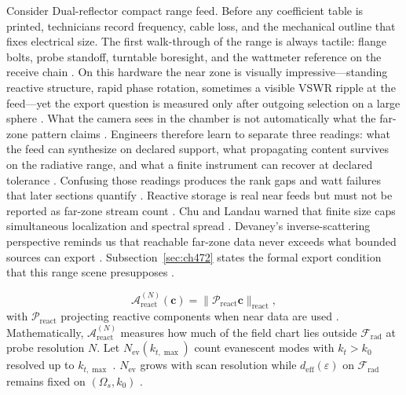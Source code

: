 \begin{physicalvignette}
Consider Dual-reflector compact range feed. Before any coefficient table is printed, technicians record frequency, cable loss, and the mechanical outline that fixes electrical size. The first walk-through of the range is always tactile: flange bolts, probe standoff, turntable boresight, and the wattmeter reference on the receive chain \cite{hansen1988}.
On this hardware the near zone is visually impressive---standing reactive structure, rapid phase rotation, sometimes a visible VSWR ripple at the feed---yet the export question is measured only after outgoing selection on a large sphere \cite{harrington2001}. What the camera sees in the chamber is not automatically what the far-zone pattern claims \cite{stratton1941}.
Engineers therefore learn to separate three readings: what the feed can synthesize on declared support, what propagating content survives on the radiative range, and what a finite instrument can recover at declared tolerance \cite{devaney2004}. Confusing those readings produces the rank gaps and watt failures that later sections quantify \cite{pal2026}.
Reactive storage is real near feeds but must not be reported as far-zone stream count . 
Chu and Landau warned that finite size caps simultaneous localization and spectral spread \cite{chu1948}. Devaney's inverse-scattering perspective reminds us that reachable far-zone data never exceeds what bounded sources can export \cite{devaney2004}.
Subsection~\ref{sec:ch472} states the formal export condition that this range scene presupposes \cite{stratton1941}.
\end{physicalvignette}
\begin{equation}
\label{eq:ch4.reactive-accessibility}
\mathcal{A}_{\mathrm{react}}^{(N)}(\mathbf{c})=\big\|\mathcal{P}_{\mathrm{react}}\mathbf{c}\big\|_{\mathrm{react}},
\end{equation}
with \(\mathcal{P}_{\mathrm{react}}\) projecting reactive components when near data are used \cite{harrington2001}. Mathematically,
\(\mathcal{A}_{\mathrm{react}}^{(N)}\) measures how much of the field chart lies outside \(\mathcal{F}_{\mathrm{rad}}\) at probe resolution \(N\).
Let \(N_{\mathrm{ev}}(k_{t,\max})\) count evanescent modes with \(k_{t}>k_{0}\) resolved up to \(k_{t,\max}\) \cite{jackson1999}.
\(N_{\mathrm{ev}}\) grows with scan resolution while \(d_{\mathrm{eff}}(\varepsilon)\) on \(\mathcal{F}_{\mathrm{rad}}\) remains fixed on
\((\Omega_{s},k_{0})\) \cite{stratton1941}.
\label{prop:ch4.reactive-not-synthesis}
